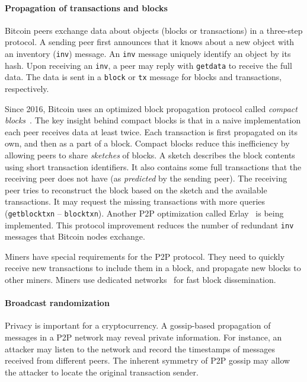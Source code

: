 \paragraph{Propagation of transactions and blocks}

Bitcoin peers exchange data about objects (blocks or transactions) in a three-step protocol.
A sending peer first announces that it knows about a new object with an inventory (\texttt{inv}) message.
An \texttt{inv} message uniquely identify an object by its hash.
Upon receiving an \texttt{inv}, a peer may reply with \texttt{getdata} to receive the full data.
The data is sent in a \texttt{block} or \texttt{tx} message for blocks and transactions, respectively.

Since 2016, Bitcoin uses an optimized block propagation protocol called \textit{compact blocks}~\cite{Core2016}.
The key insight behind compact blocks is that in a naive implementation each peer receives data at least twice.
Each transaction is first propagated on its own, and then as a part of a block.
Compact blocks reduce this inefficiency by allowing peers to share \textit{sketches} of blocks.
A sketch describes the block contents using short transaction identifiers.
It also contains some full transactions that the receiving peer does not have (as \textit{predicted} by the sending peer).
The receiving peer tries to reconstruct the block based on the sketch and the available transactions.
It may request the missing transactions with more queries (\texttt{getblocktxn} -- \texttt{blocktxn}).
Another P2P optimization called Erlay~\cite{Naumenko2019} is being implemented.
This protocol improvement reduces the number of redundant \texttt{inv} messages that Bitcoin nodes exchange.

Miners have special requirements for the P2P protocol.
They need to quickly receive new transactions to include them in a block, and propagate new blocks to other miners.
Miners use dedicated networks~\cite{FALCON, FIBRE} for fast block dissemination.


\paragraph{Broadcast randomization}

Privacy is important for a cryptocurrency.
A gossip-based propagation of messages in a P2P network may reveal private information.
For instance, an attacker may listen to the network and record the timestamps of messages received from different peers.
The inherent symmetry of P2P gossip may allow the attacker to locate the original transaction sender.

